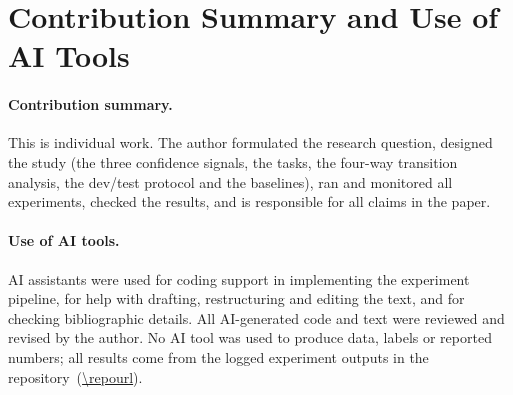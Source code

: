 \section{Contribution Summary and Use of AI Tools}
\label{app:contribution}

\paragraph{Contribution summary.} This is individual work. The author formulated the research question, designed the study (the three confidence signals, the tasks, the four-way transition analysis, the dev/test protocol and the baselines), ran and monitored all experiments, checked the results, and is responsible for all claims in the paper.

\paragraph{Use of AI tools.} AI assistants were used for coding support in implementing the experiment pipeline, for help with drafting, restructuring and editing the text, and for checking bibliographic details. All AI-generated code and text were reviewed and revised by the author. No AI tool was used to produce data, labels or reported numbers; all results come from the logged experiment outputs in the repository~(\url{\repourl}).

